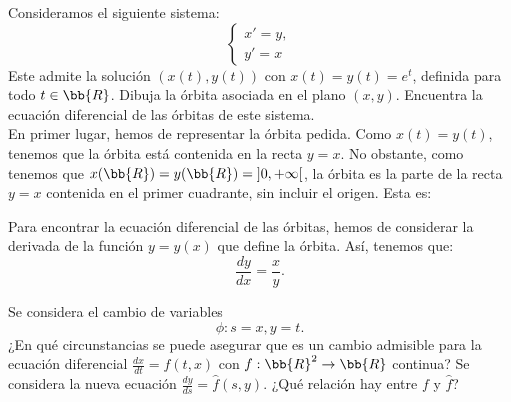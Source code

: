 \documentclass[12pt]{article}
\begin{document}
    \begin{ejercicio}
        Consideramos el siguiente sistema:
        \begin{equation*}
            \begin{cases}
                x' = y,\\
                y' = x
            \end{cases}
        \end{equation*}
        Este admite la solución $(x(t), y(t))$ con $x(t) = y(t) = e^t$, definida para todo $t \in \bb{R}$. Dibuja la órbita asociada en el plano $(x, y)$. Encuentra la ecuación diferencial de las órbitas de este sistema.\\

        En primer lugar, hemos de representar la órbita pedida. Como $x(t) = y(t)$, tenemos que la órbita está contenida en la recta $y = x$.
        No obstante, como tenemos que $x(\bb{R})=y(\bb{R}) = \left]0, +\infty\right[$, la órbita es la parte de la recta $y = x$ contenida en el primer cuadrante, sin incluir el origen. Esta es:
        \begin{figure}[H]
            \centering
        \end{figure}

        Para encontrar la ecuación diferencial de las órbitas, hemos de considerar la derivada de la función $y = y(x)$ que define la órbita. Así, tenemos que:
        \begin{equation*}
            \frac{dy}{dx} = \frac{x}{y}.
        \end{equation*}
    \end{ejercicio}

    \begin{ejercicio}
        Se considera el cambio de variables
        \begin{equation*}
            \phi : s = x, y = t.
        \end{equation*}
        ¿En qué circunstancias se puede asegurar que es un cambio admisible para la ecuación diferencial $\frac{dx}{dt} = f(t, x)$ con $f : \bb{R}^2 \to \bb{R}$ continua?
        Se considera la nueva ecuación $\frac{dy}{ds} = \hat{f}(s, y)$. ¿Qué relación hay entre $f$ y $\hat{f}$?
    \end{ejercicio}
\end{document}
